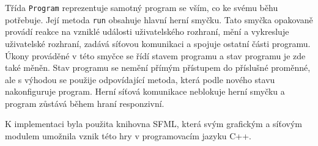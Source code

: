 \documentclass[12pt]{article}
\begin{document}
 Třída \texttt{Program} reprezentuje samotný program se vším, co ke svému běhu potřebuje. Její metoda \texttt{run} obsahuje hlavní herní smyčku. Tato smyčka opakovaně provádí reakce na vzniklé události uživatelského rozhraní, mění a vykresluje uživatelské rozhraní, zadává síťovou komunikaci a spojuje ostatní části programu. Úkony prováděné v této smyčce se řídí stavem programu a stav programu je zde také měněn. Stav programu se nemění přímým přístupem do příslušné proměnné, ale s výhodou se použije odpovídající metoda, která podle nového stavu nakonfiguruje program. Herní síťová komunikace neblokuje herní smyčku a program zůstává během hraní responzivní.
 
 K implementaci byla použita knihovna SFML, která svým grafickým a síťovým modulem umožnila vznik této hry v programovacím jazyku C++. 

 
\end{document}
